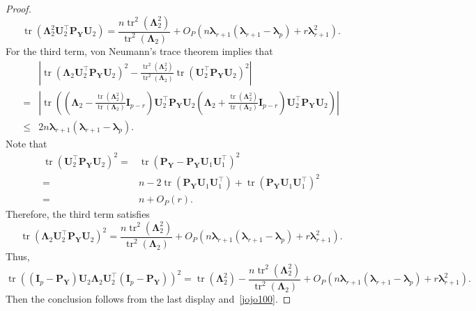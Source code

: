 \documentclass[10pt]{book}
\theoremstyle{definition}
\DeclareMathOperator{\mytr}{tr}
\newcommand{\bP}{\mathbf{P}}
\newcommand{\bY}{\mathbf{Y}}
\newcommand{\bI}{\mathbf{I}}
\newcommand{\bU}{\mathbf{U}}
\newcommand{\bfsym}[1]{\ensuremath{\boldsymbol{#1}}}
\def\blambda {\bfsym {\lambda}}
\def\bLambda {\bfsym {\Lambda}}
\begin{document}
\begin{proof}
    \begin{equation*}
 \mytr(\bLambda_2^2 \bU_2^\top \bP_\bY \bU_2)
 =
\frac{n\mytr^2(\bLambda_2^2)}{\mytr^2(\bLambda_2)}
+
O_P\left(n\blambda_{r+1}(\blambda_{r+1}-\blambda_p)+r \blambda_{r+1}^2\right).
    \end{equation*}
    For the third term, von Neumann's trace theorem implies that
    \begin{equation*}
        \begin{split}
     &\left|
     \mytr(\bLambda_2 \bU_2^\top \bP_\bY \bU_2)^2
 -
 \frac{\mytr^2(\bLambda_2^2)}{\mytr^2(\bLambda_2)}\mytr( \bU_2^\top \bP_\bY \bU_2)^2
 \right|
 \\
 =
     &\left|
\mytr\left(
\left(\bLambda_2-\frac{\mytr(\bLambda_2^2)}{\mytr(\bLambda_2)}\bI_{p-r}\right) \bU_2^\top \bP_\bY \bU_2
\left(\bLambda_2+\frac{\mytr(\bLambda_2^2)}{\mytr(\bLambda_2)}\bI_{p-r}\right) \bU_2^\top \bP_\bY \bU_2
\right)
 \right|
 \\
 \leq & 2n \blambda_{r+1}(\blambda_{r+1}-\blambda_p).
        \end{split}
    \end{equation*}
    Note that
    \begin{equation*}
        \begin{split}
        \mytr( \bU_2^\top \bP_\bY \bU_2)^2
        =&\mytr\left( \bP_\bY - \bP_\bY\bU_1\bU_1^\top \right)^2
        \\
        =& n- 2\mytr(\bP_\bY\bU_1\bU_1^\top)
        +\mytr(\bP_\bY\bU_1\bU_1^\top)^2
        \\
        =& n+O_P(r)
        .
        \end{split}
    \end{equation*}
    Therefore, the third term satisfies
    \begin{equation*}
     \mytr(\bLambda_2 \bU_2^\top \bP_\bY \bU_2)^2
 =
 \frac{n\mytr^2(\bLambda_2^2)}{\mytr^2(\bLambda_2)}
 +
O_P\left(n\blambda_{r+1}(\blambda_{r+1}-\blambda_p)+r \blambda_{r+1}^2\right).
    \end{equation*}
    Thus,
    \begin{equation*}
        \mytr\left(
         (\bI_p -\bP_\bY)\bU_2 \bLambda_2 \bU_2^\top (\bI_p- \bP_{\bY})
    \right)^2
    =
    \mytr(\bLambda_2^2)-\frac{n\mytr^2(\bLambda_2^2)}{\mytr^2(\bLambda_2)}
 +
O_P\left(n\blambda_{r+1}(\blambda_{r+1}-\blambda_p)+r \blambda_{r+1}^2\right).
    \end{equation*}
    Then the conclusion follows from the last display and~\eqref{jojo100}.
\end{proof}
\end{document}
